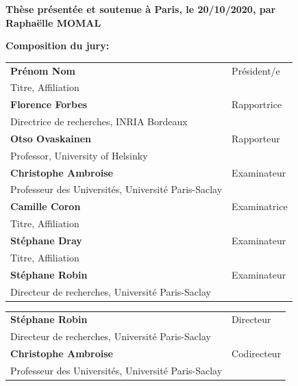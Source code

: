 \documentclass[12pt,a4paper]{book}
\begin{document}
\begin{titlepage}
\textbf{Thèse présentée et soutenue à Paris, le 20/10/2020, par}\\
\bigskip
\Large {\color{Prune} \textbf{Raphaëlle MOMAL}}


\vspace{\fill} %

\flushleft \small \textbf{Composition du jury:}
\bigskip



\scriptsize
\begin{tabular}{|p{8cm}l}
\arrayrulecolor{Prune}
\textbf{Prénom Nom} &   Président/e\\ 
Titre, Affiliation & \\
\textbf{Florence Forbes} &  Rapportrice \\ 
Directrice de recherches, INRIA Bordeaux   &   \\ 
\textbf{Otso Ovaskainen} &  Rapporteur \\ 
Professor, University of Helsinky  &   \\ 
\textbf{Christophe Ambroise} &  Examinateur \\ 
Professeur des Universités, Université Paris-Saclay  &   \\ 
\textbf{Camille Coron} &  Examinatrice \\ 
Titre, Affiliation   &   \\ 
\textbf{Stéphane Dray} &  Examinateur \\ 
Titre, Affiliation   &   \\ 
\textbf{Stéphane Robin} &   Examinateur\\ 
Directeur de recherches, Université Paris-Saclay & \\

\end{tabular} 

\medskip
\begin{tabular}{|p{8cm}l}\arrayrulecolor{white}
\textbf{Stéphane Robin} &   Directeur\\ 
Directeur de recherches, Université Paris-Saclay & \\
\textbf{Christophe Ambroise} &   Codirecteur\\ 
Professeur des Universités, Université Paris-Saclay  &   \\ 


\end{tabular} 


\end{titlepage}
\ifthispageodd{\newpage\thispagestyle{empty}\null\newpage}{}
\thispagestyle{empty}
\selectfont
\end{document}
